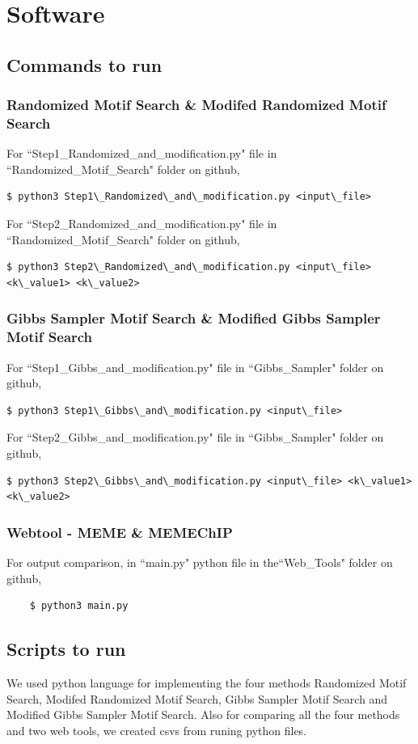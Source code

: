 \documentclass{article}
\begin{document}
\section{Software}
\subsection{Commands to run}
\subsubsection{Randomized Motif Search \& Modifed Randomized Motif Search}
For ``Step1\_Randomized\_and\_modification.py" file in ``Randomized\_Motif\_Search" folder on github,
\begin{verbatim}
$ python3 Step1\_Randomized\_and\_modification.py <input\_file>
\end{verbatim}
For ``Step2\_Randomized\_and\_modification.py" file in ``Randomized\_Motif\_Search" folder on github,
\begin{verbatim}
$ python3 Step2\_Randomized\_and\_modification.py <input\_file> <k\_value1> <k\_value2>
\end{verbatim}
\subsubsection{Gibbs Sampler Motif Search \& Modified Gibbs Sampler Motif Search}
For ``Step1\_Gibbs\_and\_modification.py" file in ``Gibbs\_Sampler" folder on github,
\begin{verbatim}
$ python3 Step1\_Gibbs\_and\_modification.py <input\_file>
\end{verbatim}
For ``Step2\_Gibbs\_and\_modification.py" file in ``Gibbs\_Sampler" folder on github,
\begin{verbatim}
$ python3 Step2\_Gibbs\_and\_modification.py <input\_file> <k\_value1> <k\_value2>
\end{verbatim}
\subsubsection{Webtool\cite{gkv416} - MEME \& MEMEChIP}
For output comparison, in ``main.py" python file in the``Web\_Tools" folder on github,
\begin{verbatim}
    $ python3 main.py
\end{verbatim}
\subsection{Scripts to run}
We used python language for implementing the four methods Randomized Motif Search, Modifed Randomized Motif Search, Gibbs Sampler Motif Search and Modified Gibbs Sampler Motif Search. Also for comparing all the four methods and two web tools, we created csvs from runing python files.
\end{document}
